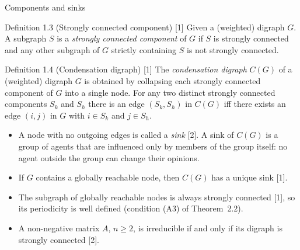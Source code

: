 \begin{frame}[label=bk-graphs-b]{Components and sinks}
  \scriptsize
  \begin{block}{Definition 1.3 (Strongly connected component) [1]}
    Given a (weighted) digraph $G$. A subgraph $S$ is a \emph{strongly connected
    component} of $G$ if $S$ is strongly connected and any other subgraph of $G$ strictly
    containing $S$ is not strongly connected.
  \end{block}
  \begin{block}{Definition 1.4 (Condensation digraph) [1]}
    The \emph{condensation digraph} $C(G)$ of a (weighted) digraph $G$ is obtained by
    collapsing each strongly connected component of $G$ into a single node. For any two
    distinct strongly connected components $S_k$ and $S_h$ there is an edge $(S_k, S_h)$
    in $C(G)$ iff there exists an edge $(i,j)$ in $G$ with $i \in S_k$ and $j \in S_h$.
  \end{block}
  \begin{itemize}
    \item A node with no outgoing edges is called a \emph{sink} [2]. A sink of $C(G)$ is a
          group of agents that are influenced only by members of the group itself: no
          agent outside the group can change their opinions.
    \item If $G$ contains a globally reachable node, then $C(G)$ has a unique sink [1].
    \item The subgraph of globally reachable nodes is always strongly connected [1], so
          its periodicity is well defined (condition (A3) of Theorem~2.2).
    \item A non-negative matrix $A$, $n \geq 2$, is irreducible if and only if its digraph
          is strongly connected [2].
  \end{itemize}
\end{frame}

